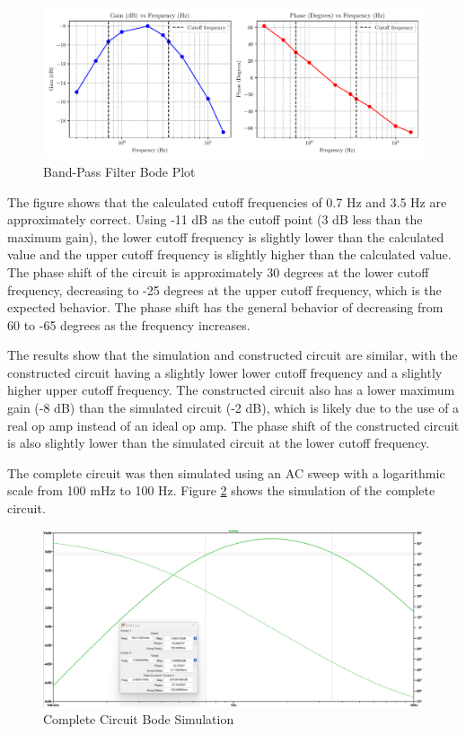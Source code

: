 \documentclass[CMPE]{KGCOEReport}
\begin{document}
\begin{figure}[H]
    \centering
    \includegraphics[width=1\textwidth]{band_pass_plot.pdf}
    \caption{Band-Pass Filter Bode Plot}
    \label{fig:bandPassBode}
\end{figure}

The figure shows that the calculated cutoff frequencies of 0.7 Hz and 3.5 Hz are approximately correct. Using -11 dB as the cutoff point (3 dB less than the maximum gain), the lower cutoff frequency is slightly lower than the calculated value and the upper cutoff frequency is slightly higher than the calculated value. The phase shift of the circuit is approximately 30 degrees at the lower cutoff frequency, decreasing to -25 degrees at the upper cutoff frequency, which is the expected behavior. The phase shift has the general behavior of decreasing from 60 to -65 degrees as the frequency increases.

The results show that the simulation and constructed circuit are similar, with the constructed circuit having a slightly lower lower cutoff frequency and a slightly higher upper cutoff frequency. The constructed circuit also has a lower maximum gain (-8 dB) than the simulated circuit (-2 dB), which is likely due to the use of a real op amp instead of an ideal op amp. The phase shift of the constructed circuit is also slightly lower than the simulated circuit at the lower cutoff frequency.

\bigskip

The complete circuit was then simulated using an AC sweep with a logarithmic scale from 100 mHz to 100 Hz. Figure \ref{fig:completeSim} shows the simulation of the complete circuit.

\begin{figure}[H]
    \centering
    \includegraphics[width=1\textwidth]{SimFreqOutputValues.png}
    \caption{Complete Circuit Bode Simulation}
    \label{fig:completeSim}
\end{figure}
\end{document}
